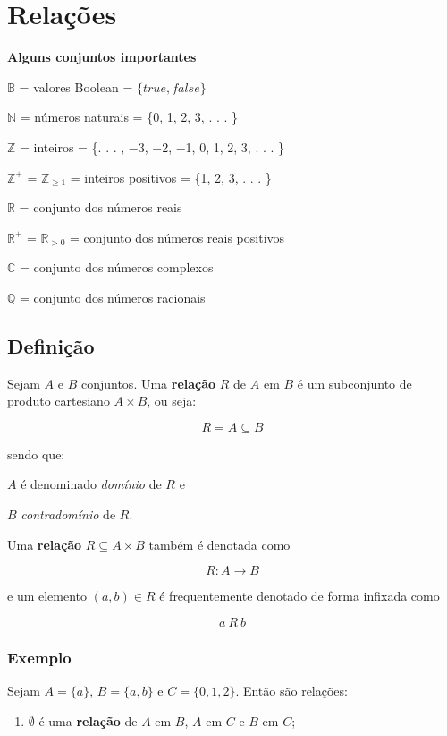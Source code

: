 \section{Relações}

    \textbf{Alguns conjuntos importantes}

\(\mathbb{B}\) = valores Boolean = \(\{true, false\}\)

\(\mathbb{N}\) = números naturais = \{0, 1, 2, 3, . . . \}

\(\mathbb{Z}\) = inteiros = \{. . . , −3, −2, −1, 0, 1, 2, 3, . . . \}

\(\mathbb{Z}^+\) = \(\mathbb{Z}_{≥1}\) = inteiros positivos = \{1, 2, 3,
. . . \}

\(\mathbb{R}\) = conjunto dos números reais

\(\mathbb{R}^+\) = \(\mathbb{R}_{>0}\) = conjunto dos números reais
positivos

\(\mathbb{C}\) = conjunto dos números complexos

\(\mathbb{Q}\) = conjunto dos números racionais

    \hypertarget{definiuxe7uxe3o}{%
\subsection{Definição}\label{definiuxe7uxe3o}}

Sejam \(A\) e \(B\) conjuntos. Uma \textbf{relação} \(R\) de \(A\) em
\(B\) é um subconjunto de produto cartesiano \(A\times B\), ou seja:

\[R=A\subseteq B\]

sendo que:

\(A\) é denominado \emph{domínio} de \(R\) e

\(B\) \emph{contradomínio} de \(R\).

    Uma \textbf{relação} \(R\subseteq A \times B\) também é denotada como

\[R: A\rightarrow B\]

e um elemento \((a,b)\in R\) é frequentemente denotado de forma infixada
como

\[a\ R\ b\]

    \hypertarget{exemplo}{%
\subsubsection{Exemplo}\label{exemplo}}

Sejam \(A=\{a\}\), \(B=\{a,b\}\) e \(C=\{0,1,2\}\). Então são relações:

    \begin{enumerate}
\def\labelenumi{\arabic{enumi})}
\item
  \(\emptyset\) é uma \textbf{relação} de \(A\) em \(B\), \(A\) em \(C\)
  e \(B\) em \(C\);
\end{enumerate}

